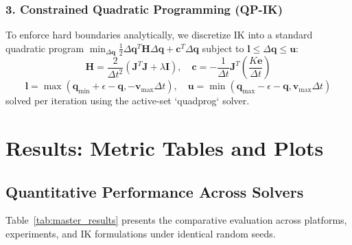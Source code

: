 \documentclass[10pt,twocolumn]{article}
\begin{document}
\subsubsection{3. Constrained Quadratic Programming (QP-IK)}
To enforce hard boundaries analytically, we discretize IK into a standard quadratic program $\min_{\Delta \mathbf{q}} \frac{1}{2} \Delta \mathbf{q}^T \mathbf{H} \Delta \mathbf{q} + \mathbf{c}^T \Delta \mathbf{q}$ subject to $\mathbf{l} \le \Delta \mathbf{q} \le \mathbf{u}$:
\begin{equation}
    \mathbf{H} = \frac{2}{\Delta t^2}(\mathbf{J}^T \mathbf{J} + \lambda \mathbf{I}), \quad \mathbf{c} = -\frac{1}{\Delta t} \mathbf{J}^T \left(\frac{K \mathbf{e}}{\Delta t}\right)
\end{equation}
\begin{equation}
    \mathbf{l} = \max(\mathbf{q}_{\min} + \epsilon - \mathbf{q}, -\mathbf{v}_{\max}\Delta t), \quad \mathbf{u} = \min(\mathbf{q}_{\max} - \epsilon - \mathbf{q}, \mathbf{v}_{\max}\Delta t)
\end{equation}
solved per iteration using the active-set `quadprog` solver.

\section{Results: Metric Tables and Plots}

\subsection{Quantitative Performance Across Solvers}
Table~\ref{tab:master_results} presents the comparative evaluation across platforms, experiments, and IK formulations under identical random seeds.
\end{document}
